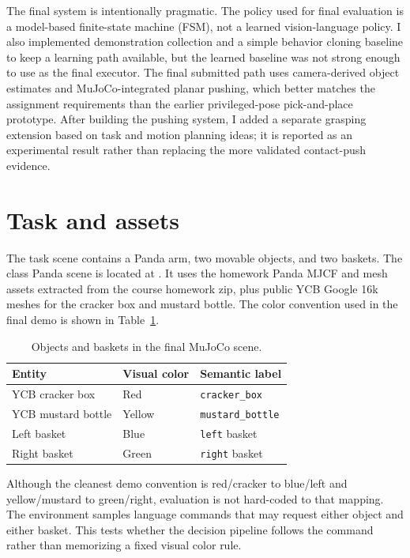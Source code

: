 \documentclass{article}
\begin{document}
The final system is intentionally pragmatic. The policy used for final evaluation is a model-based finite-state machine (FSM), not a learned vision-language policy. I also implemented demonstration collection and a simple behavior cloning baseline to keep a learning path available, but the learned baseline was not strong enough to use as the final executor. The final submitted path uses camera-derived object estimates and MuJoCo-integrated planar pushing, which better matches the assignment requirements than the earlier privileged-pose pick-and-place prototype. After building the pushing system, I added a separate grasping extension based on task and motion planning ideas; it is reported as an experimental result rather than replacing the more validated contact-push evidence.

\section{Task and assets}

The task scene contains a Panda arm, two movable objects, and two baskets. The class Panda scene is located at . It uses the homework Panda MJCF and mesh assets extracted from the course homework zip, plus public YCB Google 16k meshes for the cracker box and mustard bottle. The color convention used in the final demo is shown in Table~\ref{tab:scene}.

\begin{table}[h]
\centering
\caption{Objects and baskets in the final MuJoCo scene.}
\label{tab:scene}
\begin{tabular}{lll}
\toprule
Entity & Visual color & Semantic label \\
\midrule
YCB cracker box & Red & \texttt{cracker\_box} \\
YCB mustard bottle & Yellow & \texttt{mustard\_bottle} \\
Left basket & Blue & \texttt{left} basket \\
Right basket & Green & \texttt{right} basket \\
\bottomrule
\end{tabular}
\end{table}

Although the cleanest demo convention is red/cracker to blue/left and yellow/mustard to green/right, evaluation is not hard-coded to that mapping. The environment samples language commands that may request either object and either basket. This tests whether the decision pipeline follows the command rather than memorizing a fixed visual color rule.
\end{document}
